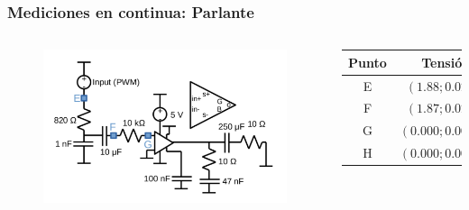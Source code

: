 \begin{frame}
\frametitle{Mediciones en continua: Parlante}
	\begin{columns}[t]
		\begin{figure}
			\centering
			\includegraphics[scale=0.3]{AmpPar}	
		\end{figure}
		\begin{table}
			\centering
			\begin{tabular}{c|c}
				Punto & Tensión\\
				\hline \hline
				E & $(1.88;0.02)V$  \\
				\hline
				F & $(1.87;0.02)V$\\
				\hline
				G & $(0.000;0.002)V$\\
				\hline
				H & $(0.000;0.002)V$\\
				\hline
			\end{tabular}
		\end{table}
	\end{columns}
\end{frame}